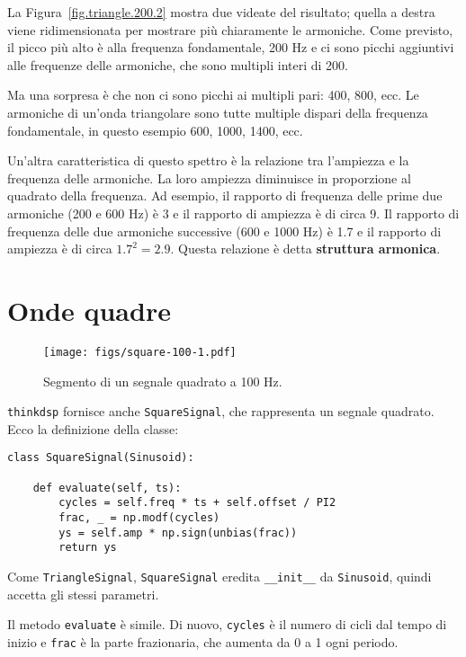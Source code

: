 \documentclass[12pt]{book} \usepackage[width=5.5in,height=8.5in, hmarginratio=3:2,vmarginratio=1:1]{geometry}
\begin{document}
La Figura~\ref{fig.triangle.200.2} mostra due videate del risultato; quella a destra viene ridimensionata per mostrare più chiaramente le armoniche. Come previsto, il picco più alto è alla frequenza fondamentale, 200 Hz e ci sono picchi aggiuntivi alle frequenze delle armoniche, che sono multipli interi di 200.

Ma una sorpresa è che non ci sono picchi ai multipli pari: 400, 800, ecc. Le armoniche di un'onda triangolare sono tutte multiple dispari della frequenza fondamentale, in questo esempio 600, 1000, 1400, ecc.

Un'altra caratteristica di questo spettro è la relazione tra l'ampiezza e la frequenza delle armoniche. La loro ampiezza diminuisce in proporzione al quadrato della frequenza. Ad esempio, il rapporto di frequenza delle prime due armoniche (200 e 600 Hz) è 3 e il rapporto di ampiezza è di circa 9. Il rapporto di frequenza delle due armoniche successive (600 e 1000 Hz) è 1.7 e il rapporto di ampiezza è di circa $1.7^2 = 2.9$. Questa relazione è detta {\bf struttura armonica}.

\section{Onde quadre} \label{square} 

\begin{figure} 

\centerline{\texttt{[image: figs/square-100-1.pdf]}} \caption{Segmento di un segnale quadrato a 100 Hz.} \label{fig.square.100.1} \end{figure} 

{\tt thinkdsp} fornisce anche {\tt SquareSignal}, che rappresenta un segnale quadrato. Ecco la definizione della classe:

\begin{verbatim} 
class SquareSignal(Sinusoid):

    def evaluate(self, ts):
        cycles = self.freq * ts + self.offset / PI2
        frac, _ = np.modf(cycles)
        ys = self.amp * np.sign(unbias(frac))
        return ys
 \end{verbatim} 

Come {\tt TriangleSignal}, {\tt SquareSignal} eredita \verb"__init__" da {\tt Sinusoid}, quindi accetta gli stessi parametri.

Il metodo {\tt evaluate} è simile. Di nuovo, {\tt cycles} è il numero di cicli dal tempo di inizio e {\tt frac} è la parte frazionaria, che aumenta da 0 a 1 ogni periodo.
\end{document}
